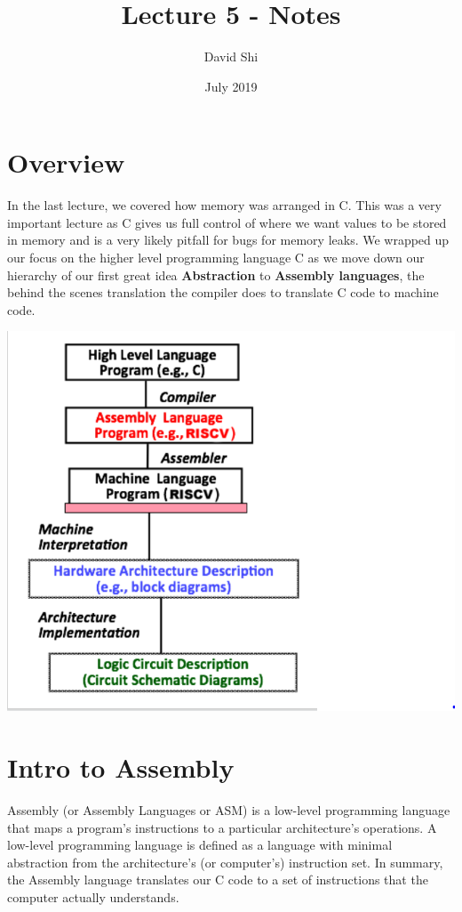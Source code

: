 \documentclass[letterpaper]{article}
\title{Lecture 5 - Notes}
\author{David Shi}
\date{July 2019}
\theoremstyle{remark}
\begin{document}
\maketitle

\section{Overview}
In the last lecture, we covered how memory was arranged in C. This was a very important lecture as C gives us full control of where we want values to be stored in memory and is a very likely pitfall for bugs for memory leaks. We wrapped up our focus on the higher level programming language C as we move down our hierarchy of our first great idea \textbf{Abstraction} to \textbf{Assembly languages}, the behind the scenes translation the compiler does to translate C code to machine code.

\begin{center}
\includegraphics[]{abstraction}
\end{center}

\section{Intro to Assembly}
Assembly (or Assembly Languages or ASM) is a low-level programming language that maps a program's instructions to a particular architecture's operations. A low-level programming language is defined as a language with minimal abstraction from the architecture's (or computer's) instruction set. In summary, the Assembly language translates our C code to a set of instructions that the computer actually understands.
\end{document}
